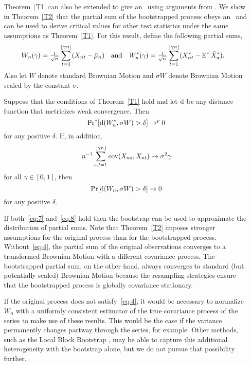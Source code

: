 \documentclass[11pt]{article}
\begin{document}
Theorem~\ref{T1} can also be extended to give an \fclt\
using arguments from \citet{JoD:00b}. We show in
Theorem~\ref{T2} that the partial sum
of the bootstrapped process obeys an \fclt\ and can be used to derive
critical values for other test statistics under the same assumptions
as Theorem~\ref{T1}. For this result, define the
following partial sums,
\begin{align*}
W_n(\gamma) &=
\tfrac{1}{\sqrt{n}} \sum_{t=1}^{\lfloor \gamma n \rfloor}
(X_{nt} - \bar\mu_n) &&\text{and}&
W_n^{*}(\gamma) &= \tfrac{1}{\sqrt{n}}
\sum_{t=1}^{\lfloor \gamma n \rfloor}
(X^*_{nt} - \operatorname{E}^* \bar X_n^*).
\end{align*}
Also let $W$ denote standard Brownian Motion and $\sigma W$ denote
Brownian Motion scaled by the constant $\sigma$.

\begin{thm}\label{T2}
Suppose that the conditions of Theorem~\ref{T1} hold
and let $\operatorname{d}$ be any distance function that metricizes weak
convergence. Then
\begin{equation}\label{eq:7}
\operatorname{Pr}^{*}[\operatorname{d}(W_n^{*}, \sigma W) > \delta] \to^p 0
\end{equation}
for any positive $\delta$. If, in addition,
\begin{equation}\label{eq:4}
n^{-1} \sum_{s,t=1}^{\lfloor \gamma n \rfloor} \operatorname{cov}(X_{ns}, X_{nt}) \to \sigma^2 \gamma
\end{equation}
for all $\gamma \in [0,1]$, then
\begin{equation}\label{eq:8}
\operatorname{Pr}[\operatorname{d}(W_n, \sigma W) > \delta] \to 0
\end{equation}
for any positive $\delta$.
\end{thm}
If both~\eqref{eq:7} and~\eqref{eq:8} hold then the bootstrap can be
used to approximate the distribution of partial sums.
Note that Theorem~\ref{T2} imposes
stronger assumptions for the original process
than for the bootstrapped process. Without~\eqref{eq:4}, the
partial sum of the original observations converges to a transformed
Brownian Motion with a different covariance process. The bootstrapped
partial sum, on the other hand, always converges to standard (but
potentially scaled) Brownian Motion because the resampling strategies
ensure that the bootstrapped process is globally covariance stationary.

If the original process does not satisfy~\eqref{eq:4}, it would be
necessary to normalize $W_n$ with a uniformly
consistent estimator of the true covariance process of the series to
make use of these results. This would be the case if the variance
permanently changes partway through the series, for example.  Other
methods, such as the Local Block Bootstrap \citep{PaP:02,DPP:03}, may
be able to capture this additional heterogeneity with the bootstrap
alone, but we do not pursue that possibility further.
\end{document}

